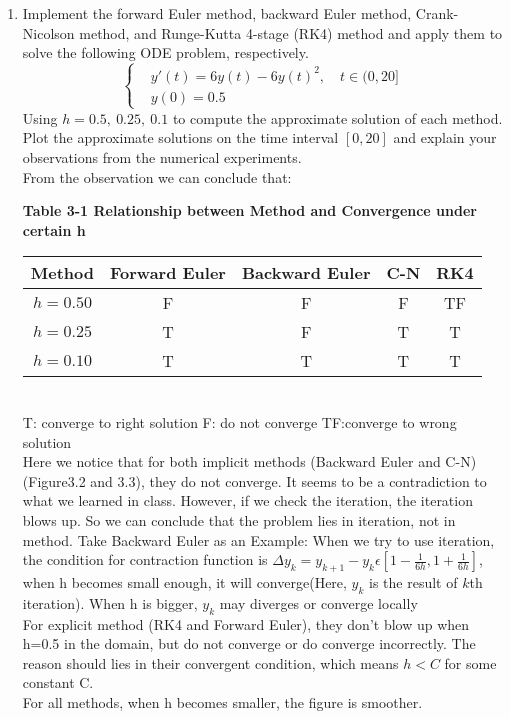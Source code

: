 \documentclass[12pt]{amsart}
\numberwithin{equation}{section}
\numberwithin{table}{section}
\numberwithin{figure}{section}
\numberwithin{algorithm}{section}
\begin{document}
\begin{enumerate}
\item Implement the forward Euler method, backward Euler method, Crank-Nicolson method, and Runge-Kutta 4-stage (RK4) method and apply them to solve the following ODE problem, respectively.
$$
\begin{cases}
&y'(t) = 6y(t) - 6y(t)^2, \quad t \in (0, 20]\\
&y(0) = 0.5
\end{cases}
$$
Using $h=0.5,\ 0.25,\ 0.1$ to compute the approximate solution of each method. Plot the approximate solutions on the time interval $[0,20]$ and explain your observations from the numerical experiments.\\
From the observation we can conclude that:\\
\begin{center}
\bf{Table 3-1 Relationship between Method and Convergence under certain h}
\end{center}
\begin{tabular}{|c|c|c|c|c|}
\hline
Method&Forward Euler&Backward Euler&C-N&RK4\\
\hline
$h=0.50$&F&F&F&TF\\
\hline
$h=0.25$&T&F&T&T\\
\hline
$h=0.10$&T&T&T&T\\
\hline
\end{tabular}
\\	
T: converge to right solution F: do not converge TF:converge to wrong solution\\
Here we notice that for both implicit methods (Backward Euler and C-N)(Figure3.2 and 3.3), they do not converge. It seems to be a contradiction to what we learned in class. However, if we check the iteration, the iteration blows up. So we can conclude that the problem lies in iteration, not in method. Take Backward Euler as an Example: When we try to use iteration, the condition for contraction function is $\Delta y_k=y_{k+1}-y_k\epsilon [1-\frac{1}{6h},1+\frac{1}{6h}]$, when h becomes small enough, it will converge(Here, $y_k$ is the result of $k$th iteration). When h is bigger, $y_k$ may diverges or converge locally\\
For explicit method (RK4 and Forward Euler), they don't blow up when h=0.5 in the domain, but do not converge or do converge incorrectly. The reason should lies in their convergent condition, which means $h<C$ for some constant C.\\
For all methods, when h becomes smaller, the figure is smoother.\\
\end{enumerate}
\end{document}
